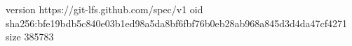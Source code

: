 version https://git-lfs.github.com/spec/v1
oid sha256:bfe19bdb5c840e03b1ed98a5da8bf6fbf76b0eb28ab968a845d3d4da47cf4271
size 385783
